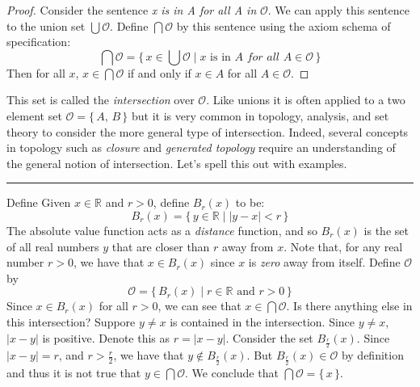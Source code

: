             \begin{proof}
                Consider the sentence \textit{x is in A for all A in}
                $\mathcal{O}$. We can apply this sentence to the union set
                $\bigcup\mathcal{O}$. Define $\bigcap\mathcal{O}$ by this
                sentence using the axiom schema of specification:
                \begin{equation}
                    \bigcap\mathcal{O}=\{\,x\in\bigcup\mathcal{O}\;|\;
                        x\textrm{ is in }A
                        \textit{ for all }A\in\mathcal{O}\,\}
                \end{equation}
                Then for all $x$, $x\in\bigcap\mathcal{O}$ if and only if
                $x\in{A}$ for all $A\in\mathcal{O}$.
            \end{proof}
            This set is called the \textit{intersection} over $\mathcal{O}$.
            Like unions it is often applied to a two element set
            $\mathcal{O}=\{\,A,\,B\,\}$ but it is very common in topology,
            analysis, and set theory to consider the more general type of
            intersection. Indeed, several concepts in topology such as
            \textit{closure} and \textit{generated topology} require an
            understanding of the general notion of intersection. Let's spell
            this out with examples.
            \par\hfill\par\hrule
            \begin{example}
                Define Given $x\in\mathbb{R}$ and $r>0$, define $B_{r}(x)$ to
                be:
                \begin{equation}
                    B_{r}(x)=\{\,y\in\mathbb{R}\;|\;|y-x|<r\,\}
                \end{equation}
                The absolute value function acts as a
                \textit{distance} function, and so $B_{r}(x)$ is the set of
                all real numbers $y$ that are closer than $r$ away from $x$.
                Note that, for any real number $r>0$, we have that
                $x\in{B}_{r}(x)$ since $x$ is \textit{zero} away from itself.
                Define $\mathcal{O}$ by
                \begin{equation}
                    \mathcal{O}=\{\,B_{r}(x)\;|\;r\in\mathbb{R}\textrm{ and }
                        r>0\,\}
                \end{equation}
                Since $x\in{B}_{r}(x)$ for all $r>0$, we can see that
                $x\in\bigcap\mathcal{O}$. Is there anything else in this
                intersection? Suppore $y\ne{x}$ is contained in the
                intersection. Since $y\ne{x}$, $|x-y|$ is positive. Denote this
                as $r=|x-y|$. Consider the set $B_{\frac{r}{2}}(x)$. Since
                $|x-y|=r$, and $r>\frac{r}{2}$, we have that
                $y\notin{B}_{\frac{r}{2}}(x)$. But
                $B_{\frac{r}{2}}(x)\in\mathcal{O}$ by definition and thus it
                is not true that $y\in\bigcap\mathcal{O}$. We conclude that
                $\bigcap\mathcal{O}=\{\,x\,\}$.
            \end{example}
